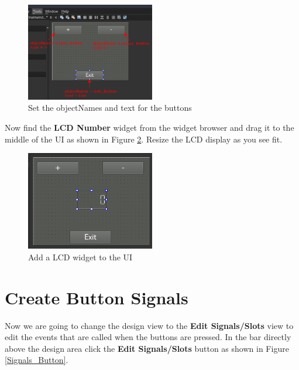 \documentclass{article}
\begin{document}
	\begin{figure}[H]
		\centering
		\includegraphics[width=0.5\textwidth]{pics/Button_Properties.png}
		\caption{Set the objectNames and text for the buttons}
		\label{Button_Properties}
	\end{figure}

Now find the \textbf{LCD Number} widget from the widget browser and drag it to the middle of the UI as shown in Figure \ref{Add_LCD}. Resize the LCD display as you see fit. 

	\begin{figure}[H]
		\centering
		\includegraphics[width=0.5\textwidth]{pics/Add_LCD.png}
		\caption{Add a LCD widget to the UI}
		\label{Add_LCD}
	\end{figure}


\section{Create Button Signals}

Now we are going to change the design view to the \textbf{Edit Signals/Slots} view to edit the events that are called when the buttons are pressed. In the bar directly above the design area click the \textbf{Edit Signals/Slots} button as shown in Figure \ref{Signals_Button}. 
\end{document}
